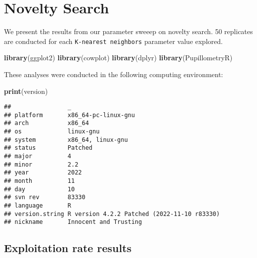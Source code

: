 \documentclass[]{book}
\newenvironment{Shaded}{\begin{snugshade}}{\end{snugshade}}
\newcommand{\KeywordTok}[1]{\textcolor[rgb]{0.13,0.29,0.53}{\textbf{#1}}}
\newcommand{\NormalTok}[1]{#1}
\begin{document}
\hypertarget{novelty-search}{%
\chapter{Novelty Search}\label{novelty-search}}

We present the results from our parameter sweeep on novelty search.
50 replicates are conducted for each \texttt{K-nearest\ neighbors} parameter value explored.

\begin{Shaded}
\begin{Highlighting}[]
\KeywordTok{library}\NormalTok{(ggplot2)}
\KeywordTok{library}\NormalTok{(cowplot)}
\KeywordTok{library}\NormalTok{(dplyr)}
\KeywordTok{library}\NormalTok{(PupillometryR)}
\end{Highlighting}
\end{Shaded}

These analyses were conducted in the following computing environment:

\begin{Shaded}
\begin{Highlighting}[]
\KeywordTok{print}\NormalTok{(version)}
\end{Highlighting}
\end{Shaded}

\begin{verbatim}
##                _                                          
## platform       x86_64-pc-linux-gnu                        
## arch           x86_64                                     
## os             linux-gnu                                  
## system         x86_64, linux-gnu                          
## status         Patched                                    
## major          4                                          
## minor          2.2                                        
## year           2022                                       
## month          11                                         
## day            10                                         
## svn rev        83330                                      
## language       R                                          
## version.string R version 4.2.2 Patched (2022-11-10 r83330)
## nickname       Innocent and Trusting
\end{verbatim}

\hypertarget{exploitation-rate-results-6}{%
\section{Exploitation rate results}\label{exploitation-rate-results-6}}
\end{document}
